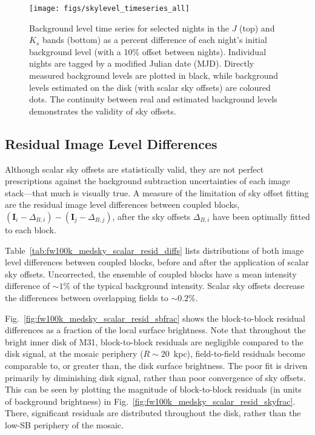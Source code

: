 \documentclass[iop]{emulateapj}
\newcommand{\vect}[1]{\boldsymbol{#1}} %
\newcommand{\Fig}[1]{Fig.~\ref{fig:#1}}  %
\newcommand{\Tab}[1]{Table~\ref{tab:#1}}  %
\begin{document}
\begin{figure}[t]
\centering
\texttt{[image: figs/skylevel\_timeseries\_all]}
\caption{Background level time series for selected nights in the $J$ (top) and $K_s$ bands (bottom) as a percent difference of each night's initial background level (with a 10\% offset between nights).
Individual nights are tagged by a modified Julian date (MJD).
Directly measured background levels are plotted in black, while background levels estimated on the disk (with scalar sky offsets) are coloured dots. The continuity between real and estimated background levels demonstrates the validity of sky offsets.}
\label{fig:skylevel_timeseries}
\end{figure}

\subsection{Residual Image Level Differences}
\label{sec:residual_diffs}

Although scalar sky offsets are statistically valid, they are not perfect prescriptions against the background subtraction uncertainties of each image stack---that much is visually true.
A measure of the limitation of sky offset fitting are the residual image level differences between coupled blocks, $(\vect{I}_i - \Delta_{B,i}) - (\vect{I}_j - \Delta_{B,j})$, after the sky offsets $\Delta_{B,i}$ have been optimally fitted to each block.

\Tab{fw100k_medsky_scalar_resid_diffs} lists distributions of both image level differences between coupled blocks, before and after the application of scalar sky offsets.
Uncorrected, the ensemble of coupled blocks have a mean intensity difference of $\sim 1\%$ of the typical background intensity.
Scalar sky offsets decrease the differences between overlapping fields to $\sim 0.2\%$.

\Fig{fw100k_medsky_scalar_resid_sbfrac} shows the block-to-block residual differences as a fraction of the local surface brightness.
Note that throughout the bright inner disk of M31, block-to-block residuals are negligible compared to the disk signal, at the mosaic periphery ($R\sim 20$~kpc), field-to-field residuals become comparable to, or greater than, the disk surface brightness.
The poor fit is driven primarily by diminishing disk signal, rather than poor convergence of sky offsets.
This can be seen by plotting the magnitude of block-to-block residuals (in units of background brightness) in \Fig{fw100k_medsky_scalar_resid_skyfrac}.
There, significant residuals are distributed throughout the disk, rather than the low-SB periphery of the mosaic.
\end{document}
